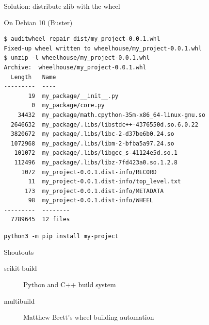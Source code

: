 \documentclass[pdf]{beamer}
\begin{document}
\begin{frame}
    Solution: distribute zlib with the wheel

\end{frame}

\begin{frame}[fragile]
    \begin{block}{On Debian 10 (Buster)}
        \begin{lstlisting}
$ auditwheel repair dist/my_project-0.0.1.whl
Fixed-up wheel written to wheelhouse/my_project-0.0.1.whl
$ unzip -l wheelhouse/my_project-0.0.1.whl
Archive:  wheelhouse/my_project-0.0.1.whl
  Length   Name
---------  ----
       19  my_package/__init__.py
        0  my_package/core.py
    34432  my_package/math.cpython-35m-x86_64-linux-gnu.so
  2646632  my_package/.libs/libstdc++-4376550d.so.6.0.22
  3820672  my_package/.libs/libc-2-d37be6b0.24.so
  1072968  my_package/.libs/libm-2-bfba5a97.24.so
   101072  my_package/.libs/libgcc_s-41124e5d.so.1
   112496  my_package/.libs/libz-7fd423a0.so.1.2.8
     1072  my_project-0.0.1.dist-info/RECORD
       11  my_project-0.0.1.dist-info/top_level.txt
      173  my_project-0.0.1.dist-info/METADATA
       98  my_project-0.0.1.dist-info/WHEEL
---------  --------
  7789645  12 files
        \end{lstlisting}
    \end{block}
\end{frame}

\begin{frame}[fragile]
    \verb|python3 -m pip install my-project|
\end{frame}

\begin{frame}
    \begin{block}{Shoutouts}
        \begin{description}
            \item [scikit-build] Python and C++ build system
            \item [multibuild] Matthew Brett's wheel building automation
        \end{description}
    \end{block}
\end{frame}
\end{document}
